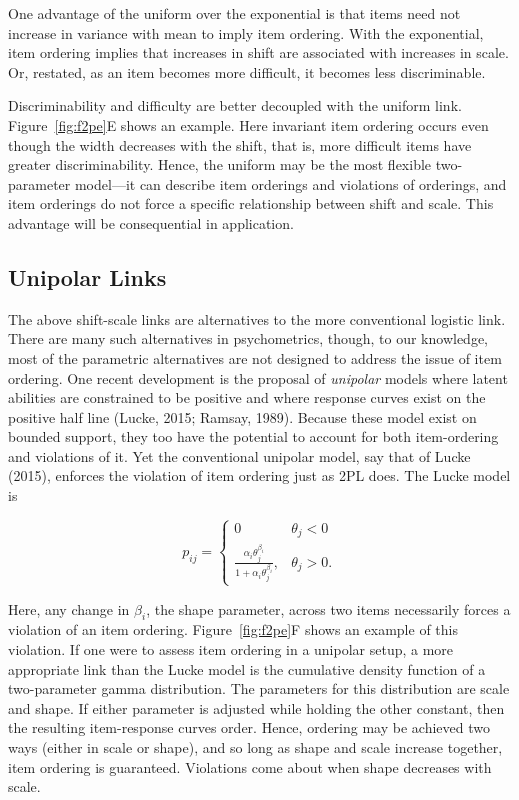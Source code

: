 \documentclass[english,,man]{apa6}
\begin{document}
One advantage of the uniform over the exponential is that items need not increase in variance with mean to imply item ordering. With the exponential, item ordering implies that increases in shift are associated with increases in scale. Or, restated, as an item becomes more difficult, it becomes less discriminable.

Discriminability and difficulty are better decoupled with the uniform link. Figure~\ref{fig:f2pe}E shows an example. Here invariant item ordering occurs even though the width decreases with the shift, that is, more difficult items have greater discriminability. Hence, the uniform may be the most flexible two-parameter model---it can describe item orderings and violations of orderings, and item orderings do not force a specific relationship between shift and scale. This advantage will be consequential in application.

\hypertarget{unipolar-links}{%
\subsection{Unipolar Links}\label{unipolar-links}}

The above shift-scale links are alternatives to the more conventional logistic link. There are many such alternatives in psychometrics, though, to our knowledge, most of the parametric alternatives are not designed to address the issue of item ordering. One recent development is the proposal of \emph{unipolar} models where latent abilities are constrained to be positive and where response curves exist on the positive half line (Lucke, 2015; Ramsay, 1989). Because these model exist on bounded support, they too have the potential to account for both item-ordering and violations of it. Yet the conventional unipolar model, say that of Lucke (2015), enforces the violation of item ordering just as 2PL does. The Lucke model is

\[
p_{ij} = \left\{\begin{array}{cc}
0 & \theta_j< 0\\
\frac{\alpha_i\theta_j^{\beta_i}}{1+\alpha_i\theta_j^{\beta_i}}, & \theta_j > 0.
\end{array}\right.
\]

Here, any change in \(\beta_i\), the shape parameter, across two items necessarily forces a violation of an item ordering. Figure~\ref{fig:f2pe}F shows an example of this violation. If one were to assess item ordering in a unipolar setup, a more appropriate link than the Lucke model is the cumulative density function of a two-parameter gamma distribution. The parameters for this distribution are scale and shape. If either parameter is adjusted while holding the other constant, then the resulting item-response curves order. Hence, ordering may be achieved two ways (either in scale or shape), and so long as shape and scale increase together, item ordering is guaranteed. Violations come about when shape decreases with scale.
\end{document}
